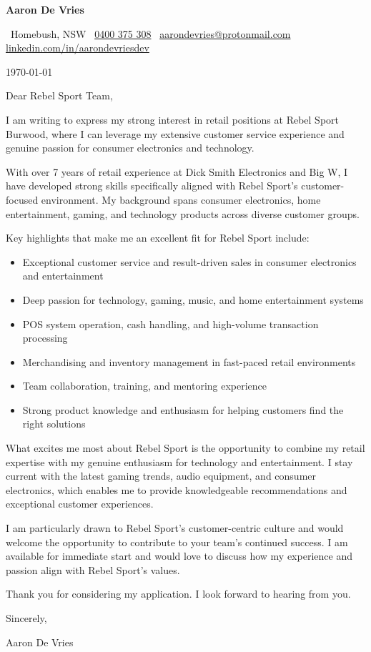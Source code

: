 \documentclass[a4paper,10pt]{article}
\makeatletter
\providecommand{\ContactBlock}{}
\renewcommand{\ContactBlock}{%
  {\Large \textbf{Aaron De Vries}}\par
  {\color{MidBlue}\small
  \faIcon{map-marker-alt}\, Homebush, NSW \quad\textbar\quad
  \faIcon{phone}\, \href{tel:+61400375308}{0400 375 308} \quad\textbar\quad
  \faIcon{envelope}\, \href{mailto:aarondevries@protonmail.com}{aarondevries@protonmail.com} \quad\textbar\quad
  \faIcon[brands]{linkedin}\, \href{https://linkedin.com/in/aarondevriesdev}{linkedin.com/in/aarondevriesdev}%
  }\par
}
\makeatother
\begin{document}
\ContactBlock

\vspace{1em}

\today

\vspace{1em}

Dear Rebel Sport Team,

I am writing to express my strong interest in retail positions at Rebel Sport Burwood, where I can leverage my extensive customer service experience and genuine passion for consumer electronics and technology.

With over 7 years of retail experience at Dick Smith Electronics and Big W, I have developed strong skills specifically aligned with Rebel Sport's customer-focused environment. My background spans consumer electronics, home entertainment, gaming, and technology products across diverse customer groups.

Key highlights that make me an excellent fit for Rebel Sport include:
\begin{itemize}
\item Exceptional customer service and result-driven sales in consumer electronics and entertainment
\item Deep passion for technology, gaming, music, and home entertainment systems
\item POS system operation, cash handling, and high-volume transaction processing
\item Merchandising and inventory management in fast-paced retail environments
\item Team collaboration, training, and mentoring experience
\item Strong product knowledge and enthusiasm for helping customers find the right solutions
\end{itemize}

What excites me most about Rebel Sport is the opportunity to combine my retail expertise with my genuine enthusiasm for technology and entertainment. I stay current with the latest gaming trends, audio equipment, and consumer electronics, which enables me to provide knowledgeable recommendations and exceptional customer experiences.

I am particularly drawn to Rebel Sport's customer-centric culture and would welcome the opportunity to contribute to your team's continued success. I am available for immediate start and would love to discuss how my experience and passion align with Rebel Sport's values.

Thank you for considering my application. I look forward to hearing from you.

Sincerely,

Aaron De Vries
\end{document}
